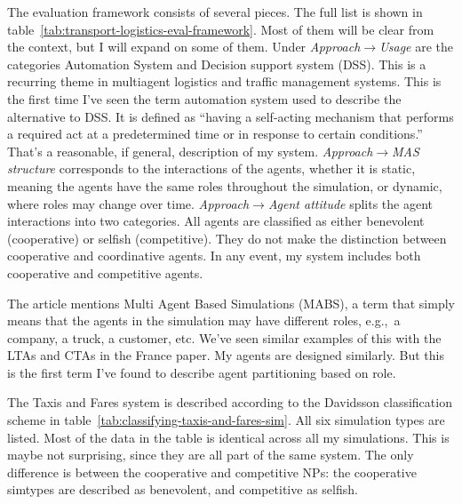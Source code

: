 \documentclass[11pt,letterpaper,onecolumn,twoside,openright,final]{report}
\begin{document}
The evaluation framework consists of several pieces.
The full list is shown in table~\ref{tab:transport-logistics-eval-framework}.
Most of them will be clear from the context, but I will expand on some of them.
Under \emph{Approach}$\to$\emph{Usage} are the categories Automation System and Decision support system (DSS).
This is a recurring theme in multiagent logistics and traffic management systems.
This is the first time I've seen the term automation system used to describe the alternative to DSS.
It is defined as ``having a self-acting mechanism that performs a required act at a predetermined time or in response to certain conditions.''
That's a reasonable, if general, description of my system.
\emph{Approach}$\to$\emph{MAS structure} corresponds to the interactions of the agents, whether it is static, meaning the agents have the same roles throughout the simulation, or dynamic, where roles may change over time.
\emph{Approach}$\to$\emph{Agent attitude} splits the agent interactions into two categories.
All agents are classified as either benevolent (cooperative) or selfish (competitive).
They do not make the distinction between cooperative and coordinative agents.
In any event, my system includes both cooperative and competitive agents.

The article mentions Multi Agent Based Simulations (MABS), a term that simply means that the agents in the simulation may have different roles, e.g.,~a company, a truck, a customer, etc.
We've seen similar examples of this with the LTAs and CTAs in the France paper.
My agents are designed similarly.
But this is the first term I've found to describe agent partitioning based on role.

The Taxis and Fares system is described according to the Davidsson classification scheme in table~\ref{tab:classifying-taxis-and-fares-sim}.
All six simulation types are listed.
Most of the data in the table is identical across all my simulations.
This is maybe not surprising, since they are all part of the same system.
The only difference is between the cooperative and competitive NPs: the cooperative simtypes are described as benevolent, and competitive as selfish.
\end{document}
